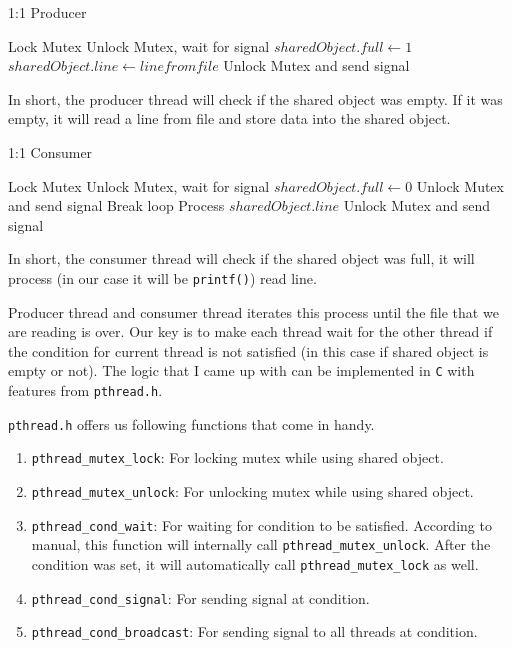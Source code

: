 \documentclass{homework}
\begin{document}
\begin{algorithm}
\caption{1:1 Producer}\label{alg:cap}
\begin{algorithmic}
\State Lock Mutex
    \State Unlock Mutex, wait for signal  
\EndIf
\State $sharedObject.full \gets 1$
\State $sharedObject.line \gets line from file$
\State Unlock Mutex and send signal 
\EndWhile
\end{algorithmic}
\end{algorithm}

In short, the producer thread will check if the shared object was empty. If it was empty, it will read a line from file and store data into the shared object.

\begin{algorithm}
\caption{1:1 Consumer}\label{alg:cap}
\begin{algorithmic}
\State Lock Mutex
    \State Unlock Mutex, wait for signal  
\EndIf
\State $sharedObject.full \gets 0$
 
    \State Unlock Mutex and send signal 
    \State Break loop
\EndIf
\State Process $sharedObject.line$
\State Unlock Mutex and send signal 
\EndWhile
\end{algorithmic}
\end{algorithm}

In short, the consumer thread will check if the shared object was full, it will process (in our case it will be \texttt{printf()}) read line.
\par
Producer thread and consumer thread iterates this process until the file that we are reading is over. Our key is to make each thread wait for the other thread if the condition for current thread is not satisfied (in this case if shared object is empty or not). The logic that I came up with can be implemented in \texttt{C} with features from \texttt{pthread.h}. 
\pagebreak
\par
\texttt{pthread.h} offers us following functions that come in handy.

\begin{enumerate}
   \item \texttt{pthread_mutex_lock}: For locking mutex while using shared object.
   \item \texttt{pthread_mutex_unlock}: For unlocking mutex while using shared object.
   \item \texttt{pthread_cond_wait}: For waiting for condition to be satisfied. According to manual, this function will internally call \texttt{pthread_mutex_unlock}. After the condition was set, it will automatically call \texttt{pthread_mutex_lock} as well.
   \item \texttt{pthread_cond_signal}: For sending signal at condition.
   \item \texttt{pthread_cond_broadcast}: For sending signal to all threads at condition.
\end{enumerate}
\end{document}
